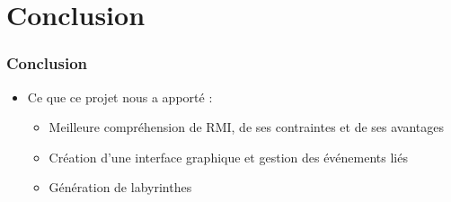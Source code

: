 \section{Conclusion}

  \begin{frame}
    \frametitle{Conclusion}
    	\begin{itemize}
    		\item Ce que ce projet nous a apporté :
    		\begin{itemize}
    			\item Meilleure compréhension de RMI, de ses contraintes et de ses avantages
    			\item Création d'une interface graphique et gestion des événements liés
    			\item Génération de labyrinthes
    		\end{itemize}
    	\end{itemize}
  \end{frame}
